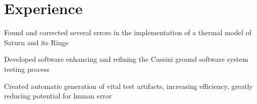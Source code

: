 \documentclass[letterpaper]{deedy-resume} %
\begin{document}
\hfill
%
%
\begin{minipage}[t]{0.66\textwidth} %


\section{Experience}






\vspace{\topsep} %
\begin{tightitemize}
\item Found and corrected several errors in the implementation of a thermal model of Saturn and its Rings
\item Developed software enhancing and refining the Cassini ground software system testing process
\item Created automatic generation of vital test artifacts, increasing efficiency, greatly reducing potential for human error
\end{tightitemize}


\end{minipage}
\end{document}
